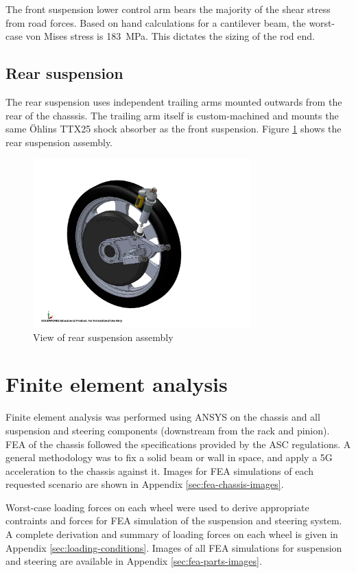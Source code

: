 \documentclass[10pt]{article}
\begin{document}
The front suspension lower control arm bears the majority of the shear stress from road forces. Based on hand calculations for a cantilever beam, the worst-case von Mises stress is \SI{183}{\mega\pascal}. This dictates the sizing of the rod end.

\subsection{Rear suspension}
The rear suspension uses independent trailing arms mounted outwards from the rear of the chasssis. The trailing arm itself is custom-machined and mounts the same \"Ohlins TTX25 shock absorber as the front suspension. Figure \ref{fig:rear-suspension} shows the rear suspension assembly.

\begin{figure}
\centering
\includegraphics[width=0.75\textwidth]{figures/rear-suspension}
\caption{View of rear suspension assembly}
\label{fig:rear-suspension}
\end{figure}

\section{Finite element analysis}
Finite element analysis was performed using ANSYS on the chassis and all suspension and steering components (downstream from the rack and pinion). FEA of the chassis followed the specifications provided by the ASC regulations. A general methodology was to fix a solid beam or wall in space, and apply a 5G acceleration to the chassis against it. Images for FEA simulations of each requested scenario are shown in Appendix \ref{sec:fea-chassis-images}.

Worst-case loading forces on each wheel were used to derive appropriate contraints and forces for FEA simulation of the suspension and steering system. A complete derivation and summary of loading forces on each wheel is given in Appendix \ref{sec:loading-conditions}. Images of all FEA simulations for suspension and steering are available in Appendix \ref{sec:fea-parts-images}.
\end{document}
